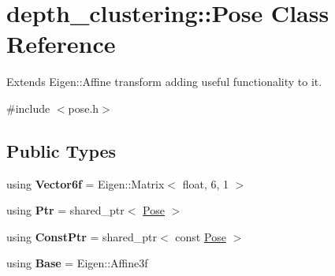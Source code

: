 \hypertarget{classdepth__clustering_1_1Pose}{\section{depth\-\_\-clustering\-:\-:Pose Class Reference}
\label{classdepth__clustering_1_1Pose}
}


Extends Eigen\-::\-Affine transform adding useful functionality to it.  




{\ttfamily \#include $<$pose.\-h$>$}

\subsection*{Public Types}
\begin{DoxyCompactItemize}
\item 
\hypertarget{classdepth__clustering_1_1Pose_a15a4a5c78b9b4b6ac2c091f614f161f3}{using {\bfseries Vector6f} = Eigen\-::\-Matrix$<$ float, 6, 1 $>$}\label{classdepth__clustering_1_1Pose_a15a4a5c78b9b4b6ac2c091f614f161f3}

\item 
\hypertarget{classdepth__clustering_1_1Pose_a0d8c1c06707fe5c183b7910b3d886a00}{using {\bfseries Ptr} = shared\-\_\-ptr$<$ \hyperlink{classdepth__clustering_1_1Pose}{Pose} $>$}\label{classdepth__clustering_1_1Pose_a0d8c1c06707fe5c183b7910b3d886a00}

\item 
\hypertarget{classdepth__clustering_1_1Pose_a15c52124f7b592fa4d60b5dc6f57b842}{using {\bfseries Const\-Ptr} = shared\-\_\-ptr$<$ const \hyperlink{classdepth__clustering_1_1Pose}{Pose} $>$}\label{classdepth__clustering_1_1Pose_a15c52124f7b592fa4d60b5dc6f57b842}

\item 
\hypertarget{classdepth__clustering_1_1Pose_a21c3df0c69a753ab98cc065f33f73f7e}{using {\bfseries Base} = Eigen\-::\-Affine3f}\label{classdepth__clustering_1_1Pose_a21c3df0c69a753ab98cc065f33f73f7e}

\end{DoxyCompactItemize}
